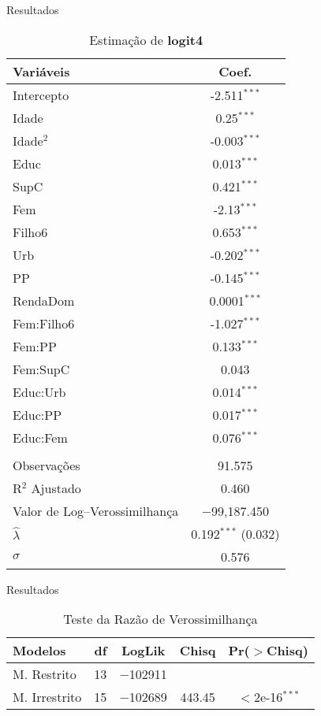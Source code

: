 \documentclass[xcolor={dvipsnames}]{beamer}
\begin{document}
\begin{frame}{Resultados}
\begin{table}[H]
    \caption{Estimação de \textbf{logit4}}
    \centering
    \begin{adjustbox}{width=.4\columnwidth,center}
    \begin{tabular}{l|c}\hline
    Variáveis   & Coef. \\\hline
    Intercepto  & -2.511$^{***}$ \\
    Idade       & 0.25$^{***}$ \\
    Idade$^2$   & -0.003$^{***}$ \\
    Educ        & 0.013$^{***}$ \\
    SupC        & 0.421$^{***}$\\
    Fem         & -2.13$^{***}$\\
    Filho6      & 0.653$^{***}$\\
    Urb         & -0.202$^{***}$\\
    PP          & -0.145$^{***}$\\
    RendaDom    & 0.0001$^{***}$\\
    Fem:Filho6  & -1.027$^{***}$ \\
    Fem:PP      & 0.133$^{***}$ \\
    Fem:SupC    & 0.043 \\
    Educ:Urb    & 0.014$^{***}$ \\
    Educ:PP     & 0.017$^{***}$\\
    Educ:Fem    & 0.076$^{***}$\\
    \hline \\[-2ex]
    \hline
    Observações & 91.575 \\ 
    R$^2$ Ajustado & 0.460 \\
    Valor de Log{--}Verossimilhança & $-$99,187.450 \\ 
    $\hat{\lambda}$ & 0.192$^{***}$  (0.032) \\ 
    $\sigma$ & 0.576 
    \\\hline
    \end{tabular}
    \end{adjustbox}
\end{table}
\end{frame}

\begin{frame}{Resultados}
\begin{table}[H]
    \caption{Teste da Razão de Verossimilhança}
    \centering
    \begin{tabular}{l|cccc}\hline
   \textbf{ Modelos}& df & LogLik & Chisq  & Pr($>$Chisq)     \\\hline
    M. Restrito   & 13 & $-$102911 &        &                \\
    M. Irrestrito & 15 & $-$102689 & 443.45 & $<$2e-16$^{***}$ \\\hline
    \end{tabular}
\end{table}
\end{frame}
\end{document}

